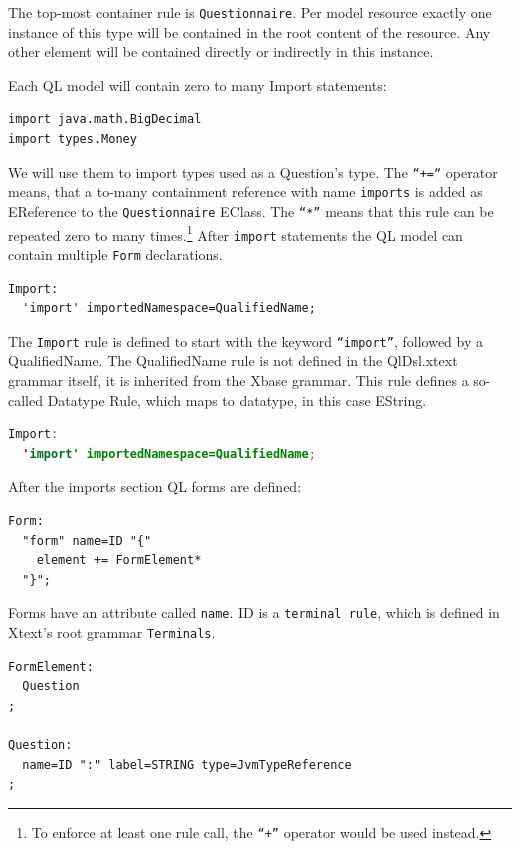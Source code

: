 The top-most container rule is \texttt{Questionnaire}. Per model resource
exactly one instance of this type will be contained in the root content of the
resource. Any other element will be contained directly or indirectly in this
instance.

Each QL model will contain zero to many Import statements: 
\begin{lstlisting}[language=QL]
import java.math.BigDecimal
import types.Money
\end{lstlisting}

We will use them to
import types used as a Question's type. The \texttt{``+=``} operator means, that
a to-many containment reference with name \texttt{imports} is added as EReference to the
\texttt{Questionnaire} EClass. The \texttt{``*''} means that this rule can be
repeated zero to many times.\footnote{To enforce at least one rule call, the
\texttt{``+''} operator would be used instead.}
After \texttt{import} statements the QL model can contain multiple \texttt{Form}
declarations.

\begin{lstlisting}[language=Xtext]
Import:
  'import' importedNamespace=QualifiedName;
\end{lstlisting}

The \texttt{Import} rule is defined to start with the keyword
\texttt{``import''}, followed by a QualifiedName. The QualifiedName rule is not
defined in the QlDsl.xtext grammar itself, it is inherited from the Xbase
grammar. This rule defines a so-called Datatype Rule, which maps to datatype,
in this case EString.

\begin{lstlisting}[language=Java]
Import:
  'import' importedNamespace=QualifiedName;
\end{lstlisting}

After the imports section QL forms are defined:

\begin{lstlisting}[language=Xtext]
Form:
  "form" name=ID "{"
    element += FormElement*
  "}";
\end{lstlisting}

Forms have an attribute called \texttt{name}. ID is a \texttt{terminal rule},
which is defined in Xtext's root grammar \texttt{Terminals}. 


\begin{lstlisting}[language=Xtext]
FormElement:
  Question
;

Question:
  name=ID ":" label=STRING type=JvmTypeReference
;
\end{lstlisting}
